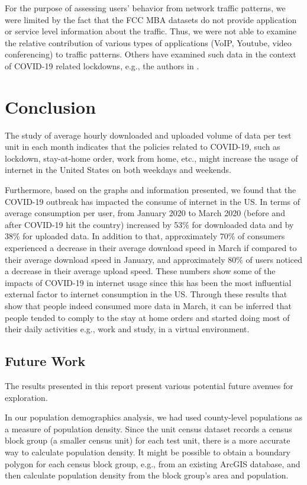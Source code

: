 \documentclass[conference,10pt]{IEEEtran}
\begin{document}
For the purpose of assessing users' behavior from network traffic patterns, we were limited by the fact that the FCC MBA datasets do not provide application or service level information about the traffic. Thus, we were not able to examine the relative contribution of various types of applications (VoIP, Youtube, video conferencing) to traffic patterns. Others have examined such data in the context of COVID-19 related lockdowns, e.g., the authors in \cite{bottger2020internet}.

\section{Conclusion}
\label{sec:conclusion}

The study of average hourly downloaded and uploaded volume of data per test unit in each month indicates that the policies related to COVID-19, such as lockdown, stay-at-home order, work from home, etc., might increase the usage of internet in the United States on both weekdays and weekends.

Furthermore, based on the graphs and information presented, we found that the COVID-19 outbreak has impacted the consume of internet in the US. In terms of average consumption per user, from January 2020 to March 2020 (before and after COVID-19 hit the country) increased by 53\% for downloaded data and by 38\% for uploaded data. In addition to that, approximately 70\% of consumers experienced a decrease in their average download speed in March if compared to their average download speed in January, and approximately 80\% of users noticed a decrease in their average upload speed. These numbers show some of the impacts of COVID-19 in internet usage since this has been the most influential external factor to internet consumption in the US. Through these results that show that people indeed consumed more data in March, it can be inferred that people tended to comply to the stay at home orders and started doing most of their daily activities e.g., work and study, in a virtual environment.

\subsection{Future Work}
\label{sec:future-work}

The results presented in this report present various potential future avenues for exploration.

In our population demographics analysis, we had used county-level populations as a measure of population density. Since the unit census dataset records a census block group (a smaller census unit) for each test unit, there is a more accurate way to calculate population density. It might be possible to obtain a boundary polygon for each census block group, e.g., from an existing ArcGIS database, and then calculate population density from the block group's area and population.
\end{document}
